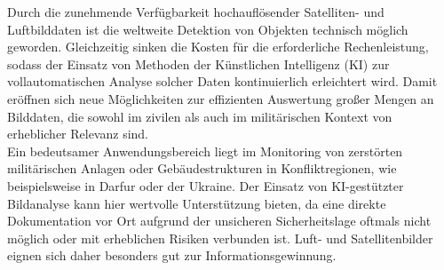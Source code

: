 



Durch die zunehmende Verfügbarkeit hochauflösender Satelliten- und Luftbilddaten ist die weltweite Detektion von Objekten technisch möglich geworden. Gleichzeitig sinken die Kosten für die erforderliche Rechenleistung, sodass der Einsatz von Methoden der Künstlichen Intelligenz (KI) zur vollautomatischen Analyse solcher Daten kontinuierlich erleichtert wird. Damit eröffnen sich neue Möglichkeiten zur effizienten Auswertung großer Mengen an Bilddaten, die sowohl im zivilen als auch im militärischen Kontext von erheblicher Relevanz sind. \\

Ein bedeutsamer Anwendungsbereich liegt im Monitoring von zerstörten militärischen Anlagen oder Gebäudestrukturen in Konfliktregionen, wie beispielsweise in Darfur \cite{Knoth2017} oder der Ukraine. Der Einsatz von KI-gestützter Bildanalyse kann hier wertvolle Unterstützung bieten, da eine direkte Dokumentation vor Ort aufgrund der unsicheren Sicherheitslage oftmals nicht möglich oder mit erheblichen Risiken verbunden ist. Luft- und Satellitenbilder eignen sich daher besonders gut zur Informationsgewinnung. \\

